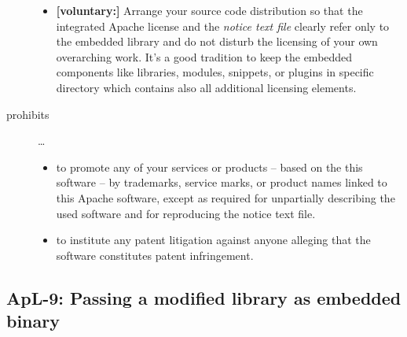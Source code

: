\begin{description}
\begin{itemize}
  \item \textbf{[voluntary:]} Arrange your source code distribution so that the
  integrated Apache license and the \emph{notice text file} clearly refer only
  to the embedded library and do not disturb the licensing of your own
  overarching work. It's a good tradition to keep the embedded components like
  libraries, modules, snippets, or plugins in specific directory which contains
  also all additional licensing elements.
 
\end{itemize}

\item[prohibits] \ldots
\begin{itemize}
  \item to promote any of your services or products – based on the this software
  – by trademarks, service marks, or product names linked to this Apache
  software, except as required for unpartially describing the used software and
  for reproducing the notice text file.
  \item to institute any patent litigation against anyone alleging that the
  software constitutes patent infringement.
\end{itemize}

\end{description}


\subsection{ApL-9: Passing a modified library as embedded binary}

